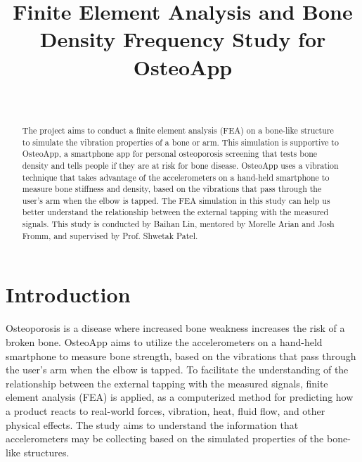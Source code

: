 \documentclass{sigchi}
\begin{document}
\title{Finite Element Analysis and Bone Density Frequency Study for OsteoApp}

\author{%
  \\
}

\maketitle

\begin{abstract}
The project aims to conduct a finite element analysis (FEA) on a bone-like structure to simulate the vibration properties of a bone or arm. This simulation is supportive to OsteoApp, a smartphone app for personal osteoporosis screening that tests bone density and tells people if they are at risk for bone disease. OsteoApp uses a vibration technique that takes advantage of the accelerometers on a hand-held smartphone to measure bone stiffness and density, based on the vibrations that pass through the user's arm when the elbow is tapped. The FEA simulation in this study can help us better understand the relationship between the external tapping with the measured signals. This study is conducted by Baihan Lin, mentored by Morelle Arian and Josh Fromm, and supervised by Prof. Shwetak Patel.

\end{abstract}



\section{Introduction}

Osteoporosis is a disease where increased bone weakness increases the risk of a broken bone. OsteoApp aims to utilize the accelerometers on a hand-held smartphone to measure bone strength, based on the vibrations that pass through the user's arm when the elbow is tapped. To facilitate the understanding of the relationship between the external tapping with the measured signals, finite element analysis (FEA) is applied, as a computerized method for predicting how a product reacts to real-world forces, vibration, heat, fluid flow, and other physical effects. The study aims to understand the information that accelerometers may be collecting based on the simulated properties of the bone-like structures. \\
\end{document}
